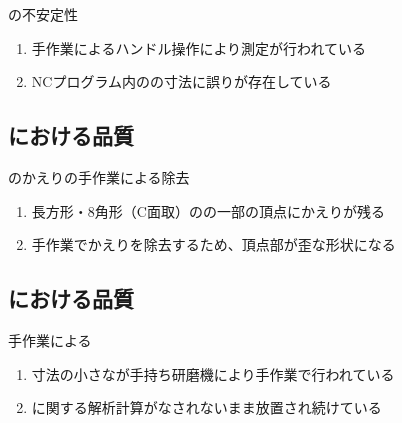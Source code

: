 \begin{Issues}{\CurvedOutcutMilling の不安定性}
\begin{enumerate}[label=\sarrow]
\item[{\sarrow[red]}]手作業によるハンドル操作により測定が行われている
\item[{\sarrow[red]}]NCプログラム内の\OutcutLength の寸法に誤りが存在している
\end{enumerate}
\end{Issues}


\clearpage
\subsection{\KeywayMilling における品質}

\begin{Issues}{\KeywayMilling のかえりの手作業による除去}
\begin{enumerate}[label=\sarrow]
\item[{\sarrow[red]}]長方形・8角形（C面取）の\KeywayMilling の一部の頂点にかえりが残る
\item[{\sarrow[red]}]手作業でかえりを除去するため、頂点部が歪な形状になる
\end{enumerate}
\end{Issues}


\subsection{\EndFaceChamferMilling における品質}

\begin{Issues}{手作業による\EndFaceChamferMilling}
\begin{enumerate}[label=\sarrow]
\item[{\sarrow[red]}]
寸法の小さな\EndFaceChamferMilling が手持ち研磨機により手作業で行われている
\item[{\sarrow[red]}]\EndFaceChamferMilling に関する解析計算がなされないまま放置され続けている
\end{enumerate}
\end{Issues}

